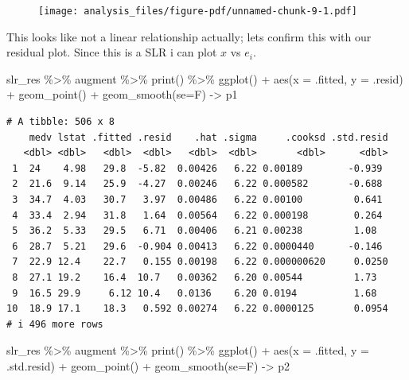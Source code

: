\documentclass[
  letterpaper,
  DIV=11,
  numbers=noendperiod]{scrreprt}
\newenvironment{Shaded}{\begin{snugshade}}{\end{snugshade}}
\newcommand{\AttributeTok}[1]{\textcolor[rgb]{0.65,0.35,0.00}{#1}}
\newcommand{\FunctionTok}[1]{\textcolor[rgb]{0.02,0.16,0.49}{#1}}
\newcommand{\NormalTok}[1]{\textcolor[rgb]{0.33,0.33,0.33}{#1}}
\newcommand{\OtherTok}[1]{\textcolor[rgb]{0.85,0.12,0.09}{#1}}
\newcommand{\SpecialCharTok}[1]{\textcolor[rgb]{0.00,0.46,0.62}{#1}}
\begin{document}
\begin{figure}[H]

{\centering \texttt{[image: analysis\_files/figure-pdf/unnamed-chunk-9-1.pdf]}

}

\end{figure}

This looks like not a linear relationship actually; lets confirm this
with our residual plot. Since this is a SLR i can plot \(x\) vs \(e_i\).

\begin{Shaded}
\begin{Highlighting}[]
\NormalTok{slr\_res }\SpecialCharTok{\%\textgreater{}\%}\NormalTok{ augment }\SpecialCharTok{\%\textgreater{}\%} \FunctionTok{print}\NormalTok{() }\SpecialCharTok{\%\textgreater{}\%} 
  \FunctionTok{ggplot}\NormalTok{() }\SpecialCharTok{+} \FunctionTok{aes}\NormalTok{(}\AttributeTok{x =}\NormalTok{ .fitted, }\AttributeTok{y =}\NormalTok{ .resid) }\SpecialCharTok{+} \FunctionTok{geom\_point}\NormalTok{() }\SpecialCharTok{+} \FunctionTok{geom\_smooth}\NormalTok{(}\AttributeTok{se=}\NormalTok{F) }\OtherTok{{-}\textgreater{}}\NormalTok{ p1}
\end{Highlighting}
\end{Shaded}

\begin{verbatim}
# A tibble: 506 x 8
    medv lstat .fitted .resid    .hat .sigma     .cooksd .std.resid
   <dbl> <dbl>   <dbl>  <dbl>   <dbl>  <dbl>       <dbl>      <dbl>
 1  24    4.98   29.8  -5.82  0.00426   6.22 0.00189        -0.939 
 2  21.6  9.14   25.9  -4.27  0.00246   6.22 0.000582       -0.688 
 3  34.7  4.03   30.7   3.97  0.00486   6.22 0.00100         0.641 
 4  33.4  2.94   31.8   1.64  0.00564   6.22 0.000198        0.264 
 5  36.2  5.33   29.5   6.71  0.00406   6.21 0.00238         1.08  
 6  28.7  5.21   29.6  -0.904 0.00413   6.22 0.0000440      -0.146 
 7  22.9 12.4    22.7   0.155 0.00198   6.22 0.000000620     0.0250
 8  27.1 19.2    16.4  10.7   0.00362   6.20 0.00544         1.73  
 9  16.5 29.9     6.12 10.4   0.0136    6.20 0.0194          1.68  
10  18.9 17.1    18.3   0.592 0.00274   6.22 0.0000125       0.0954
# i 496 more rows
\end{verbatim}

\begin{Shaded}
\begin{Highlighting}[]
\NormalTok{slr\_res }\SpecialCharTok{\%\textgreater{}\%}\NormalTok{ augment }\SpecialCharTok{\%\textgreater{}\%} \FunctionTok{print}\NormalTok{() }\SpecialCharTok{\%\textgreater{}\%} 
  \FunctionTok{ggplot}\NormalTok{() }\SpecialCharTok{+} \FunctionTok{aes}\NormalTok{(}\AttributeTok{x =}\NormalTok{ .fitted, }\AttributeTok{y =}\NormalTok{ .std.resid) }\SpecialCharTok{+} \FunctionTok{geom\_point}\NormalTok{() }\SpecialCharTok{+} \FunctionTok{geom\_smooth}\NormalTok{(}\AttributeTok{se=}\NormalTok{F) }\OtherTok{{-}\textgreater{}}\NormalTok{ p2}
\end{Highlighting}
\end{Shaded}
\end{document}
